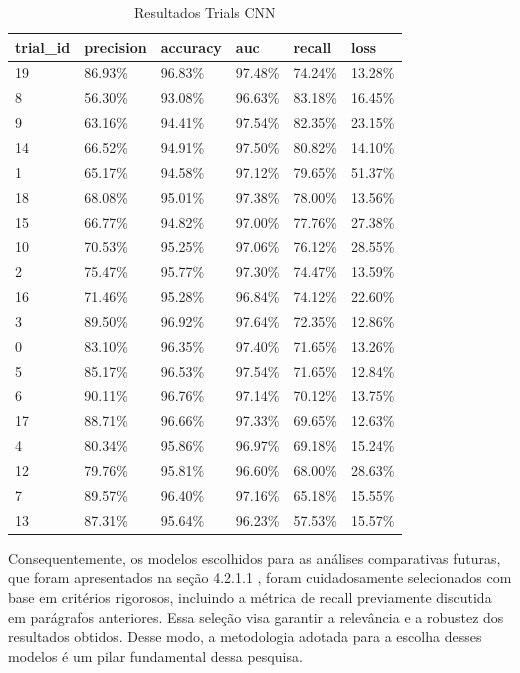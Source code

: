 \begin{table}[H]
    \centering
    \caption{Resultados Trials CNN}
    \label{tab:trials_cnn}
    \begin{tabular}{@{}llllll@{}}
        \toprule
        \textbf{trial\_id} & \textbf{precision} & \textbf{accuracy} & \textbf{auc} & \textbf{recall} & \textbf{loss} \\
        \midrule
        19 & 86.93\% & 96.83\% & 97.48\% & 74.24\% & 13.28\% \\
        8 & 56.30\% & 93.08\% & 96.63\% & 83.18\% & 16.45\% \\
        9 & 63.16\% & 94.41\% & 97.54\% & 82.35\% & 23.15\% \\
        14 & 66.52\% & 94.91\% & 97.50\% & 80.82\% & 14.10\% \\
        1 & 65.17\% & 94.58\% & 97.12\% & 79.65\% & 51.37\% \\
        18 & 68.08\% & 95.01\% & 97.38\% & 78.00\% & 13.56\% \\
        15 & 66.77\% & 94.82\% & 97.00\% & 77.76\% & 27.38\% \\
        10 & 70.53\% & 95.25\% & 97.06\% & 76.12\% & 28.55\% \\
        2 & 75.47\% & 95.77\% & 97.30\% & 74.47\% & 13.59\% \\
        16 & 71.46\% & 95.28\% & 96.84\% & 74.12\% & 22.60\% \\
        3 & 89.50\% & 96.92\% & 97.64\% & 72.35\% & 12.86\% \\
        0 & 83.10\% & 96.35\% & 97.40\% & 71.65\% & 13.26\% \\
        5 & 85.17\% & 96.53\% & 97.54\% & 71.65\% & 12.84\% \\
        6 & 90.11\% & 96.76\% & 97.14\% & 70.12\% & 13.75\% \\
        17 & 88.71\% & 96.66\% & 97.33\% & 69.65\% & 12.63\% \\
        4 & 80.34\% & 95.86\% & 96.97\% & 69.18\% & 15.24\% \\
        12 & 79.76\% & 95.81\% & 96.60\% & 68.00\% & 28.63\% \\
        7 & 89.57\% & 96.40\% & 97.16\% & 65.18\% & 15.55\% \\
        13 & 87.31\% & 95.64\% & 96.23\% & 57.53\% & 15.57\% \\
        \bottomrule
    \end{tabular}
\end{table}

Consequentemente, os modelos escolhidos para as análises comparativas futuras, que foram apresentados na seção 4.2.1.1 , foram cuidadosamente selecionados com base em critérios rigorosos, incluindo a métrica de recall previamente discutida em parágrafos anteriores. Essa seleção visa garantir a relevância e a robustez dos resultados obtidos. Desse modo, a metodologia adotada para a escolha desses modelos é um pilar fundamental dessa pesquisa. 

